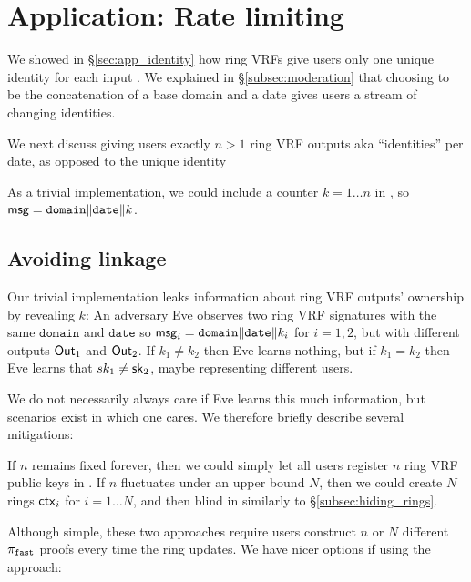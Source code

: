 \section{Application: Rate limiting}
\label{sec:app_rate_limits}

We showed in \S\ref{sec:app_identity} how ring VRFs give users only
one unique identity for each input \msg.  
We explained in \S\ref{subsec:moderation} that choosing \msg to be
the concatenation of a base domain and a date gives users a stream of changing identities.

We next discuss giving users exactly $n > 1$ ring VRF outputs aka
``identities'' per date, as opposed to the unique identity 



As a trivial implementation, we could include a counter $k = 1 \ldots n$
in \msg, so $\mathsf{msg} = \mathtt{domain} \| \mathtt{date} \| k$.


\subsection{Avoiding linkage}

Our trivial implementation leaks information about ring VRF outputs'
 ownership by revealing $k$:
%
An adversary Eve observes two ring VRF signatures with the same
$\mathtt{domain}$ and $\mathtt{date}$ so
$\mathsf{msg}_i = \mathtt{domain} \| \mathtt{date} \| k_i$
for $i=1,2$, but with different outputs ${\mathsf{Out}}_1$ and ${\mathsf{Out}}_2$.
If $k_1 \ne k_2$ then Eve learns nothing, but if $k_1 = k_2$ then
 Eve learns that $sk_1 \ne \mathsf{sk}_2$, maybe representing different users. 

We do not necessarily always care if Eve learns this much information,
but scenarios exist in which one cares.  We therefore briefly describe
several mitigations:

If $n$ remains fixed forever, then we could simply let all users
register $n$ ring VRF public keys in \ctx.
If $n$ fluctuates under an upper bound $N$, then we could create $N$
rings $\mathsf{ctx}_i$ for $i = 1 \ldots N$, and
 then blind \comring in \pifast similarly to \S\ref{subsec:hiding_rings}.

Although simple, these two approaches require users construct $n$ or $N$
different $\pi_{\mathtt{fast}}$ proofs every time the ring \ctx updates.
We have nicer options if using the \pisafe approach: 

